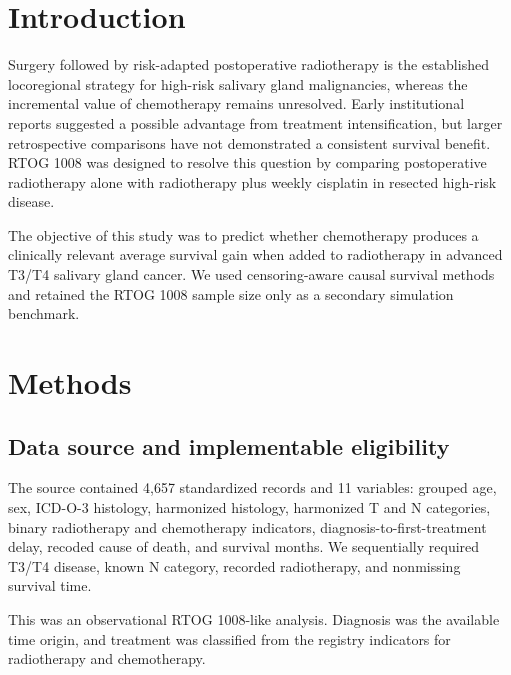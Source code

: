 \documentclass[10pt,twocolumn]{article}
\begin{document}
\section{Introduction}
Surgery followed by risk-adapted postoperative radiotherapy is the established locoregional strategy for high-risk salivary gland malignancies, whereas the incremental value of chemotherapy remains unresolved. Early institutional reports suggested a possible advantage from treatment intensification, but larger retrospective comparisons have not demonstrated a consistent survival benefit. RTOG 1008 was designed to resolve this question by comparing postoperative radiotherapy alone with radiotherapy plus weekly cisplatin in resected high-risk disease.\par
The objective of this study was to predict whether chemotherapy produces a clinically relevant average survival gain when added to radiotherapy in advanced T3/T4 salivary gland cancer. We used censoring-aware causal survival methods and retained the RTOG 1008 sample size only as a secondary simulation benchmark.\par
\section{Methods}
\subsection{Data source and implementable eligibility}
The source contained 4,657 standardized records and 11 variables: grouped age, sex, ICD-O-3 histology, harmonized histology, harmonized T and N categories, binary radiotherapy and chemotherapy indicators, diagnosis-to-first-treatment delay, recoded cause of death, and survival months. We sequentially required T3/T4 disease, known N category, recorded radiotherapy, and nonmissing survival time.\par
This was an observational RTOG 1008-like analysis. Diagnosis was the available time origin, and treatment was classified from the registry indicators for radiotherapy and chemotherapy.\par
\end{document}
